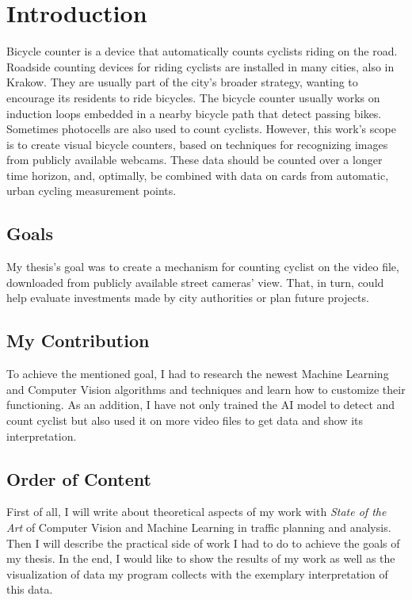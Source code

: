 \chapter{Introduction}
\label{cha:introduction}

Bicycle counter is a device that automatically counts cyclists riding on the road. Roadside counting devices for riding cyclists are installed in many cities, also in Krakow. They are usually part of the city's broader strategy, wanting to encourage its residents to ride bicycles. The bicycle counter usually works on induction loops embedded in a nearby bicycle path that detect passing bikes. Sometimes photocells are also used to count cyclists. However, this work's scope is to create visual bicycle counters, based on techniques for recognizing images from publicly available webcams. These data should be counted over a longer time horizon, and, optimally, be combined with data on cards from automatic, urban cycling measurement points.

\section{Goals}
\label{sec:goals}

My thesis's goal was to create a mechanism for counting cyclist on the video file, downloaded from publicly available street cameras' view. That, in turn, could help evaluate investments made by city authorities or plan future projects.

\section{My Contribution}
\label{sec:myContribution}

To achieve the mentioned goal, I had to research the newest Machine Learning and Computer Vision algorithms and techniques and learn how to customize their functioning. As an addition, I have not only trained the AI model to detect and count cyclist but also used it on more video files to get data and show its interpretation.

\section{Order of Content}
\label{sec:orderOfContent}
First of all, I will write about theoretical aspects of my work with \textit{State of the Art} of Computer Vision and Machine Learning in traffic planning and analysis. Then I will describe the practical side of work I had to do to achieve the goals of my thesis. In the end, I would like to show the results of my work as well as the visualization of data my program collects with the exemplary interpretation of this data. 














